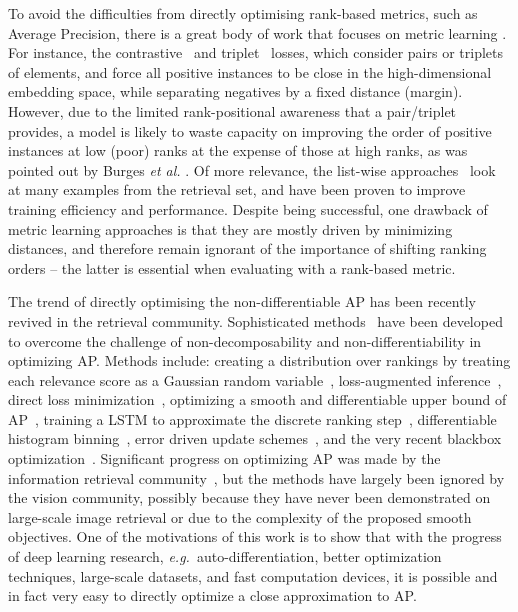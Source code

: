 \documentclass[runningheads]{llncs}
\providecommand{\eg}[0]{\emph{e.g.}}
\begin{document}
To avoid the difficulties from directly optimising rank-based metrics, such as Average Precision, 
there is a great body of work that focuses on metric learning \cite{Arandjelovic16,Arandjelovic2013,burges2007learning,Cao07,Chen19,Chopra05,Jegou11b,Law17,Movshovitz17,Hyun16,rao2018cvpr,Ustinova16,Wang19ranked,Weinberger06}.  For instance, the contrastive~\cite{Chopra05} and triplet~\cite{Weinberger06} losses, which consider pairs or triplets of elements,
and force all positive instances to be close in the high-dimensional embedding space, 
while separating negatives by a fixed distance (margin).
However, due to the limited rank-positional awareness that a pair/triplet provides, 
a model is likely to waste capacity on improving the order of positive instances 
at low (poor) ranks at the expense of those at high ranks, 
as was pointed out by Burges \textit{et al.} \cite{burges2007learning}.
Of more relevance,
the list-wise approaches~\cite{burges2007learning,Cao07,Movshovitz17,Hyun16,Wang19ranked}
look at many examples from the retrieval set, and have been proven to improve training efficiency and performance.
Despite being successful, one drawback of metric learning approaches is that
they are mostly driven by minimizing distances, and 
therefore remain ignorant of the importance of shifting ranking orders -- the latter is essential when evaluating with a rank-based metric.

The trend of directly optimising the non-differentiable AP has been recently revived in the retrieval community.
Sophisticated methods~\cite{Cakir19,Chen19,engilberge2019sodeep,he2018hashing,He18_ap,henderson2016end,mcfee2010metric,prillo2020softsort,Revaud19,Rolnek20optimizing,Song16,Taylor08,Ustinova16,cross_batch_MAP,Yue07}
have been developed to overcome the challenge of non-decomposability and non-differentiability in optimizing AP. 
Methods include:  
creating a distribution over rankings by treating each relevance score as a Gaussian random variable~\cite{Taylor08}, 
loss-augmented inference~\cite{mcfee2010metric}, 
direct loss minimization~\cite{henderson2016end,Song16}, 
optimizing a smooth and differentiable upper bound of AP~\cite{mcfee2010metric,Mohapatra18,Yue07},
training a LSTM to approximate the discrete ranking step~\cite{engilberge2019sodeep}, 
differentiable histogram binning~\cite{Cakir19,he2018hashing,He18_ap,Revaud19,Ustinova16},
error driven update schemes~\cite{Chen19b}, 
and the very recent blackbox optimization~\cite{Rolnek20optimizing}.
Significant progress on optimizing AP was made by the information retrieval community~\cite{burges2007learning,Chapelle07,John08,li2014maximal,Qin10,Taylor08}, but the methods have largely been ignored by the vision community, 
possibly because they have never been demonstrated on large-scale image retrieval or due to the complexity of the proposed smooth objectives. 
One of the motivations of this work is to show that with the progress of deep learning research, 
\eg~auto-differentiation, better optimization techniques, large-scale datasets, and fast computation devices, 
it is possible and in fact very easy to directly optimize a close approximation to AP.
\end{document}
